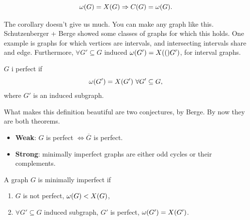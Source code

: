\begin{cor}
 $$\omega(G) = X(G) \Rightarrow C(G) = \omega(G).$$
\end{cor}

The corollary doesn't give us much. You can make any graph like this. Schutzenberger + Berge showed some classes of graphs for which this holds. One example is graphs for which vertices are intervals, and intersecting intervals share and edge. Furthermore, $\forall G' \subseteq G$ induced $\omega(G') = X(()G')$, for interval graphs.

\begin{definition}
 $G$ i perfect if $$\omega(G') = \chrom{G'}\ \forall G' \subseteq G,$$ where $G'$ is an induced subgraph.
\end{definition}

What makes this definition beautiful are two conjectures, by Berge. By now they are both theorems.
\begin{itemize}
 \item \textbf{Weak}: $G$ is perfect $\Leftrightarrow \overline{G}$ is perfect.
 \item \textbf{Strong}: minimally imperfect graphs are either odd cycles or their complements.
\end{itemize}

\begin{definition}
 A graph $G$ is minimally imperfect if
 \begin{enumerate}
  \item $G$ is not perfect, \ie $\omega(G) < X(G)$,
  \item $\forall G' \subseteq G$ induced subgraph, $G'$ is perfect, \ie $\omega(G') = X(G')$.
 \end{enumerate}

\end{definition}




